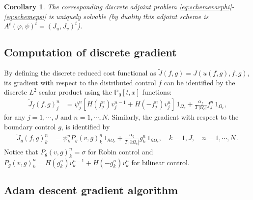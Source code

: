 \documentclass[11pt]{article}
\newtheorem{corollary}[theorem]{Corollary}
\numberwithin{theorem}{section}
\begin{document}
\begin{corollary} The corresponding  discrete adjoint problem \eqref{eq:schemevarphi}-\eqref{eq:schemepsi} is uniquely solvable (by duality this  adjoint scheme is  $A^t (\varphi,\psi)^t=(J_u,J_v)^t$).
\end{corollary} 

\subsection{Computation of discrete gradient}

By defining the discrete reduced cost functional as $\widetilde J(f,g)=J(u(f,g),f,g)$, its gradient   with respect to the distributed control $f$ can be identified by the discrete $L^2$ scalar product using the $\mathbb{P}_0[t,x]$ functions:
\begin{align*}
  \widetilde  J_f(f,g)_j^n&=%
  \psi_j^n [ H(f_j^n)v_j^{n-1}+H(-f_j^n)v_j^n ]\, 1_{\Omega_c}
    + \frac{\alpha_f}{T\, |\Omega_c|} 
    f_j^n \, 1_{\Omega_c},
\end{align*}
for any  $j=1,\cdots,J$ and $ n=1,\cdots,N$. 
Similarly, the gradient with respect to the boundary control $g$, is identified by
\begin{align*}
    \widetilde J_g(f,g)_k^n&= %
    \psi_k^n 
    P_g(v,g)_k^n\, 1_{\partial\Omega_c}
    + \frac{\alpha_g}{T\, |\partial\Omega_c|} 
    g_k^n \, 1_{\partial\Omega_c},
     \quad k=1,J,\quad n=1,\cdots,N\,.
\end{align*}
Notice that %
$P_g(v,g)_k^n=\sigma$ for Robin control and 
$P_g(v,g)_k^n=H(g_k^n)v_k^{n-1}+H(-g_k^n)v_k^{n}$ for bilinear control.

\subsection{Adam descent gradient algorithm}
\end{document}
